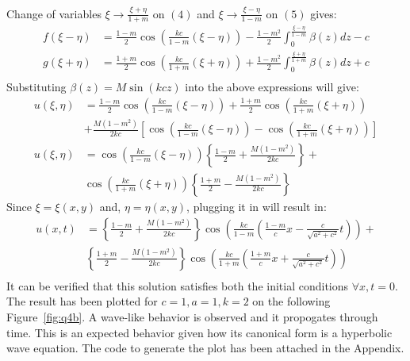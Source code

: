 \documentclass[11pt]{article}
\begin{document}
\begin{enumerate}
\begin{enumerate}[label = (\alph*)]
\begin{align}
\end{align}
Change of variables $\xi \rightarrow \frac{\xi + \eta}{1+m}$ on $(4)$ and $\xi \rightarrow \frac{\xi - \eta}{1-m}$ on $(5)$ gives:
\begin{align*}
f(\xi - \eta) & = \frac{1-m}{2} \cos\left(\frac{kc}{1-m}(\xi-\eta)\right) - \frac{1-m^2}{2} \int_0^\frac{\xi - \eta}{1-m} \beta(z) dz - c \\
g(\xi + \eta) & = \frac{1+m}{2}\cos\left(\frac{kc}{1+m} (\xi + \eta)\right) + \frac{1-m^2}{2}\int_0^\frac{\xi + \eta}{1+m} \beta(z) dz + c \\
\end{align*}
Substituting $\beta(z) = M\sin(kcz)$ into the above expressions will give: 
\begin{align*}
u(\xi,\eta) & = \frac{1-m}{2}\cos\left(\frac{kc}{1-m}(\xi-\eta)\right) + \frac{1+m}{2}\cos\left(\frac{kc}{1+m}(\xi + \eta)\right) \\ & + \frac{M(1-m^2)}{2kc}\left[ \cos\left(\frac{kc}{1-m}(\xi-\eta)\right) - \cos\left(\frac{kc}{1+m}(\xi+\eta)\right) \right] \\
u(\xi,\eta) & = \cos\left(\frac{kc}{1-m}(\xi-\eta)\right)\left\{ \frac{1-m}{2} + \frac{M(1-m^2)}{2kc} \right\} + \\ & \cos\left(\frac{kc}{1+m}(\xi + \eta)\right) \left\{ \frac{1+m}{2} - \frac{M(1-m^2)}{2kc}\right\}
\end{align*}
Since $\xi = \xi(x,y)$ and, $\eta = \eta(x,y)$, plugging it in will result in:
\begin{align*}
u(x,t) & = \left\{ \frac{1-m}{2} + \frac{M(1-m^2)}{2kc}\right\} \cos\left(\frac{kc}{1-m} \left(\frac{1-m}{c}x - \frac{c}{\sqrt{a^2+c^2}}t \right)\right) + \\ & \left\{ \frac{1+m}{2} - \frac{M(1-m^2)}{2kc}\right\}\cos\left(\frac{kc}{1+m}\left(\frac{1+m}{c}x + \frac{c}{\sqrt{a^2+c^2}}t\right)\right)\\
\end{align*} 
It can be verified that this solution satisfies both the initial conditions $\forall x, t = 0$. The result has been plotted for $c=1, a=1, k=2$ on the following Figure~\ref{fig:q4b}. A wave-like behavior is observed and it propogates through time. This is an expected behavior given how its canonical form is a hyperbolic wave equation. The code to generate the plot has been attached in the Appendix. \\
\begin{figure}[htp]
  \begin{center}

\end{center}
\end{figure}
\end{enumerate}
\end{enumerate}
\end{document}
